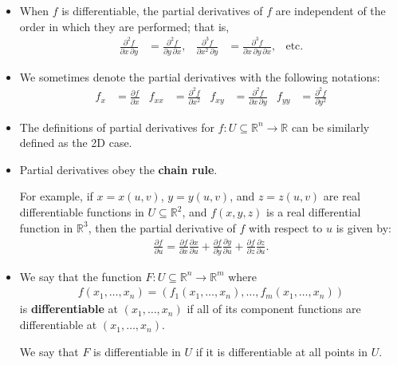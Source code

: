 \documentclass[10pt]{article}
\newcommand{\ra}{\rightarrow}
\newcommand{\Real}{\mathbb{R}}
\newcommand{\sseq}{\subseteq}
\begin{document}
\begin{itemize}
    \item When $f$ is differentiable, the partial derivatives of $f$ are independent of the order in which they are performed; that is,
    \begin{align*}
      \frac{\partial^2 f}{\partial x\, \partial y} &= \frac{\partial^2 f}{\partial y\, \partial x}, &
      \frac{\partial^3 f}{\partial x^2\, \partial y} &= \frac{\partial^3 f}{\partial x\, \partial y\, \partial x}, &
      \mbox{etc.}
    \end{align*}

    \item We sometimes denote the partial derivatives with the following notations:
    \begin{align*}
      f_x &= \frac{\partial f}{\partial x} &
      f_{xx} &= \frac{\partial^2 f}{\partial x^2} &
      f_{xy} &= \frac{\partial^2 f}{\partial x\, \partial y} &
      f_{yy} &= \frac{\partial^2 f}{\partial y^2}
    \end{align*}

    \item The definitions of partial derivatives for $f: U \subseteq \Real^n \ra \Real$ can be similarly defined as the 2D case.

    \item Partial derivatives obey the {\bf chain rule}.

    For example, if $x = x(u,v)$, $y = y(u,v)$, and $z = z(u,v)$ are real differentiable functions in $U \sseq \Real^2$, and $f(x,y,z)$ is a real differential function in $\Real^3$, then the partial derivative of $f$ with respect to $u$ is given by:
    \begin{align*}
      \frac{\partial f}{\partial u} = \frac{\partial f}{\partial x} \frac{\partial x}{\partial u} + \frac{\partial f}{\partial y} \frac{\partial y}{\partial u} + \frac{\partial f}{\partial z} \frac{\partial z}{\partial u}.
    \end{align*}

    \item We say that the function $F : U \sseq \Real^n \ra \Real^m$ where
    \begin{align*}
      f(x_1, \dotsc, x_n) = (f_1(x_1, \dotsc, x_n), \dotsc, f_m(x_1, \dotsc, x_n))
    \end{align*}
    is {\bf differentiable} at $(x_1, \dotsc, x_n)$ if all of its component functions are differentiable at $(x_1, \dotsc, x_n)$.

    We say that $F$ is differentiable in $U$ if it is differentiable at all points in $U$.


\end{itemize}
\end{document}
